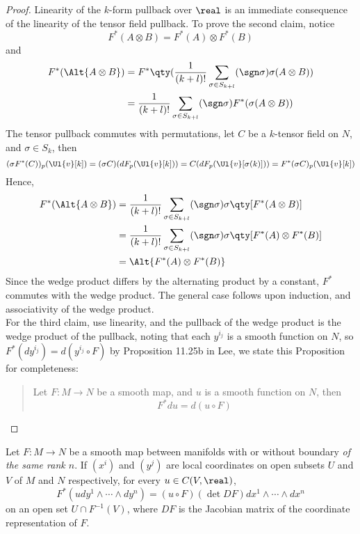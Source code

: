 \documentclass[../main-v2-manifolds.tex]{subfiles}
\begin{document}
    \begin{proof}
        Linearity of the $k$-form pullback over $\real$ is an immediate consequence of the linearity of the tensor field pullback. To prove the second claim, notice 
        \[
            F^*(A\otimes B) = F^*(A)\otimes F^*(B)
        \]
        and
        \begin{align*}
            F^*(\Alt{A\otimes B}) &= F^*\qty(\dfrac{1}{(k+l)!}\sum_{\sigma\in S_{k+l}}(\sgn\sigma)\sigma(A\otimes B))\\
            &= \dfrac{1}{(k+l)!}\sum_{\sigma\in S_{k+l}}(\sgn\sigma)F^*(\sigma(A\otimes B))
        \end{align*}
        The tensor pullback commutes with permutations, let $C$ be a $k$-tensor field on $N$, and $\sigma\in S_k$, then
        \[
            (\sigma F^*(C))_p(\Ul{v}[k]) = (\sigma C) (dF_p(\Ul{v}[k])) = C(dF_p(\Ul{v}[\sigma(k)])) = F^*(\sigma C)_p(\Ul{v}[k])
        \]
        Hence,
        \begin{align*}
            F^*(\Alt{A\otimes B}) &= \dfrac{1}{(k+l)!}\sum_{\sigma\in S_{k+l}}(\sgn\sigma)\sigma\qty[ F^*(A\otimes B)]\\
            &= \dfrac{1}{(k+l)!}\sum_{\sigma\in S_{k+l}}(\sgn\sigma)\sigma\qty[ F^*(A)\otimes F^*(B)]\\
            &= \Alt{F^*(A)\otimes F^*(B)}
        \end{align*}
        Since the wedge product differs by the alternating product by a constant, $F^*$ commutes with the wedge product. The general case follows upon induction, and associativity of the wedge product.\\

        For the third claim, use linearity, and the pullback of the wedge product is the wedge product of the pullback, noting that each $y^{i_j}$ is a smooth function on $N$, so $F^*(dy^{i_j}) = d(y^{i_j}\circ F)$ by Proposition 11.25b in Lee, we state this Proposition for completeness:
        \begin{quote}
            Let $F:M\to N$ be a smooth map, and $u$ is a smooth function on $N$, then
            \[
                F^*du = d(u\circ F)
            \]
        \end{quote}
    \end{proof}
    \begin{wts}\label{lee-chp14:corollary-14.21}
        Let $F: M\to N$ be a smooth map between manifolds with or without boundary \emph{of the same rank $n$}. If $(x^i)$ and $(y^j)$ are local coordinates on open subsets $U$ and $V$ of $M$ and $N$ respectively, for every $u\in C(V,\real)$, 
        \[
            F^*(udy^1\wedge \cdots\wedge dy^n)= (u\circ F)(\det DF)dx^1\wedge\cdots\wedge dx^n
        \]
        on an open set $U\cap F^{-1}(V)$, where $DF$ is the Jacobian matrix of the coordinate representation of $F$. 
    \end{wts}
\end{document}
